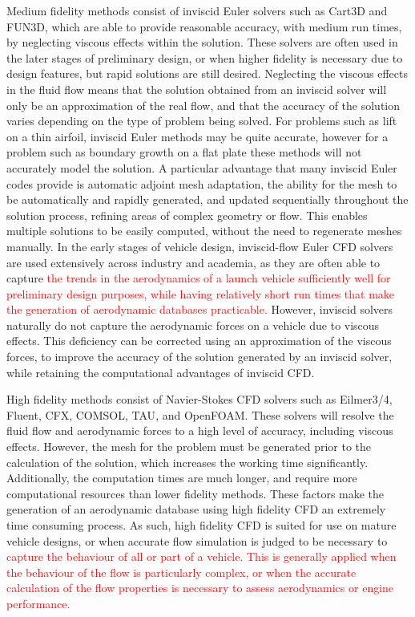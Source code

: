 Medium fidelity methods consist of inviscid Euler solvers such as Cart3D\cite{CART3D} and FUN3D\cite{fun3d}, which are able to provide reasonable accuracy, with medium run times, by neglecting viscous effects within the solution. These solvers are often used in the later stages of preliminary design, or when higher fidelity is necessary due to design features, but rapid solutions are still desired.  Neglecting the viscous effects in the fluid flow means that the solution obtained from an inviscid solver will only be an approximation of the real flow, and that the accuracy of the solution varies depending on the type of problem being solved. For problems such as lift on a thin airfoil, inviscid Euler methods may be quite accurate, however for a problem such as boundary growth on a flat plate these methods will not accurately model the solution\cite{NASAEuler}. A particular advantage that many inviscid Euler codes provide is automatic adjoint mesh adaptation, the ability for the mesh to be automatically and rapidly generated, and updated sequentially throughout the solution process, refining areas of complex geometry or flow. This enables multiple solutions to be easily computed, without the need to regenerate meshes manually. In the early stages of vehicle design, inviscid-flow Euler CFD solvers are used extensively across industry and academia\cite{Almosnino2016}, as they are often able to capture \textcolor{red}{the trends in the aerodynamics of a launch vehicle sufficiently well for preliminary design purposes, while having relatively short run times that make the generation of aerodynamic databases practicable.}
 However, inviscid solvers naturally do not capture the aerodynamic forces on a vehicle due to viscous effects. This deficiency can be corrected using an approximation of the viscous forces, to improve the accuracy of the solution generated by an inviscid solver, while retaining the computational advantages of inviscid CFD\cite{Ward2018}. 

High fidelity methods consist of Navier-Stokes CFD solvers such as Eilmer3/4\cite{Gollan2013b}, Fluent\cite{Ansys2014}, CFX\cite{CFX}, COMSOL\cite{comsol}, TAU\cite{Schwamborn2006}, and OpenFOAM\cite{openfoam}. These solvers will resolve the fluid flow and aerodynamic forces to a high level of accuracy, including viscous effects. However, the mesh for the problem must be generated prior to the calculation of the solution, which increases the working time significantly. Additionally, the computation times are much longer, and require more computational resources than lower fidelity methods. These factors make the generation of an aerodynamic database using high fidelity CFD an extremely time consuming process. As such, high fidelity CFD is suited for use on mature vehicle designs, or when accurate flow simulation is judged to be necessary to \textcolor{red}{capture the behaviour of all or part of a vehicle. This is generally applied when the behaviour of the flow is particularly complex, or when the accurate calculation of the flow properties is necessary to assess aerodynamics or engine performance.}



